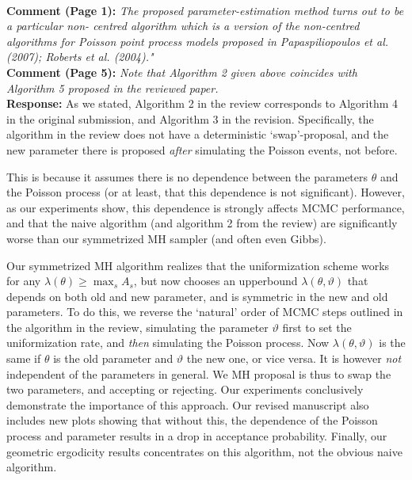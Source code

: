 \documentclass[11pt]{article}
\newcommand{\rev}[2]{\textbf{Comment #1: }\emph{#2}}
\newcommand{\resp}{\textbf{Response: }}
\begin{document}
~\\
\rev{(Page 1)}{The proposed parameter-estimation method turns out to be a particular non- centred algorithm which is a version of the non-centred algorithms for Poisson point process models proposed in Papaspiliopoulos et al. (2007); Roberts et al.  (2004)."}\\
\rev {(Page 5)}{Note that Algorithm 2 given above coincides with Algorithm 5 proposed in the reviewed paper.}\\
\resp
As we stated, Algorithm 2 in the review corresponds to Algorithm 4 in the original submission, and Algorithm 3 in the revision. Specifically, the algorithm in the review does not have a deterministic `swap'-proposal, and the new parameter there is proposed {\em after} simulating the Poisson events, not before.

This is because it assumes there is no dependence between the parameters $\theta$ and the Poisson process (or at least, that this dependence is not significant). However, as our experiments show, this dependence is strongly affects MCMC performance, and that the  naive algorithm (and algorithm 2 from the review) are significantly worse than our symmetrized MH sampler (and often even Gibbs).

Our symmetrized MH algorithm  realizes that the uniformization scheme works for any $\lambda(\theta) \ge \max_s A_s$, but now chooses an upperbound $\lambda(\theta, \vartheta)$ that depends on both old and new parameter, and is symmetric in the new and old parameters. 
To do this, we reverse the `natural' order of MCMC steps outlined in the algorithm in the review, simulating the parameter $\vartheta$ first to set the uniformization rate, and \emph{then} simulating the Poisson process. 
Now $\lambda(\theta,\vartheta)$ is the same if $\theta$ is the old parameter and $\vartheta$ the new one, or vice versa. It is however \emph{not} independent of the parameters in general.
We MH proposal is thus to swap the two parameters, and accepting or rejecting.
Our experiments conclusively demonstrate the importance of this approach. Our revised manuscript also includes new plots showing that without this, the dependence of the Poisson process and parameter results in a drop in acceptance probability. Finally, our geometric ergodicity results concentrates on this algorithm, not the obvious naive algorithm.
\end{document}
